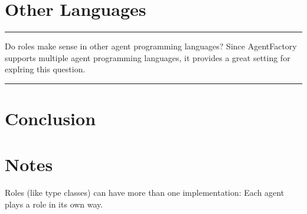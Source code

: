 \documentclass[conference,compsoc]{IEEEtran}
\newenvironment{notes}{\medskip\hrule\nobreak\smallskip\narrower}{\smallskip\hrule\medskip}
\begin{document}
\section{Other Languages}

\begin{notes}
Do roles make sense in other agent programming languages? Since AgentFactory
supports multiple agent programming languages, it provides a great setting
for explring this question.
\end{notes}

\section{Conclusion}

\section*{Notes}

Roles (like type classes) can have more than one implementation: Each
agent plays a role in its own way.




\end{document}
